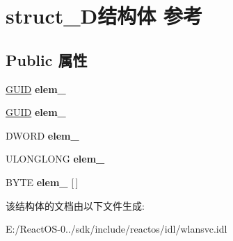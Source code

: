 \hypertarget{structstruct___d}{}\section{struct\+\_\+\+D结构体 参考}
\label{structstruct___d}
\subsection*{Public 属性}
\begin{DoxyCompactItemize}
\item 
\mbox{\label{structstruct___d_a642c68986706747f1eb198354ba6d08f}} 
\hyperlink{interface_g_u_i_d}{G\+U\+ID} {\bfseries elem\+\_}
\item 
\mbox{\label{structstruct___d_a0b6266141a493a354192d9060802451e}} 
\hyperlink{interface_g_u_i_d}{G\+U\+ID} {\bfseries elem\+\_}
\item 
\mbox{\label{structstruct___d_a68f256ab60d08f5911cff3e331e9df84}} 
D\+W\+O\+RD {\bfseries elem\+\_}
\item 
\mbox{\label{structstruct___d_a2f8e28e1acff5826517206f5d28e6f48}} 
U\+L\+O\+N\+G\+L\+O\+NG {\bfseries elem\+\_}
\item 
\mbox{\label{structstruct___d_a9c0c05dc91cc187dc40fa4772b842c70}} 
B\+Y\+TE {\bfseries elem\+\_} \mbox{[}$\,$\mbox{]}
\end{DoxyCompactItemize}


该结构体的文档由以下文件生成\+:\begin{DoxyCompactItemize}
\item 
E\+:/\+React\+O\+S-\/0../sdk/include/reactos/idl/wlansvc.\+idl\end{DoxyCompactItemize}
